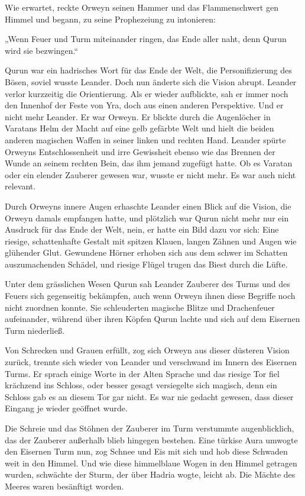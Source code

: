 \documentclass[10pt, a4paper, oneside]{book}
\begin{document}
Wie erwartet, reckte Orweyn seinen Hammer und das Flammenschwert gen Himmel und begann, zu seine Prophezeiung zu intonieren:

„Wenn Feuer und Turm miteinander ringen, das Ende aller naht, denn Qurun wird sie bezwingen.“

Qurun war ein hadrisches Wort für das Ende der Welt, die Personifizierung des Bösen, soviel wusste Leander. Doch nun änderte sich die Vision abrupt. Leander verlor kurzzeitig die Orientierung. Als er wieder aufblickte, sah er immer noch den Innenhof der Feste von Yra, doch aus einen anderen Perspektive. Und er nicht mehr Leander. Er war Orweyn. Er blickte durch die Augenlöcher in Varatans Helm der Macht auf eine gelb gefärbte Welt und hielt die beiden anderen magischen Waffen in seiner linken und rechten Hand. Leander spürte Orweyns Entschlossenheit und irre Gewissheit ebenso wie das Brennen der Wunde an seinem rechten Bein, das ihm jemand zugefügt hatte. Ob es Varatan oder ein elender Zauberer gewesen war, wusste er nicht mehr. Es war auch nicht relevant.

Durch Orweyns innere Augen erhaschte Leander einen Blick auf die Vision, die Orweyn damals empfangen hatte, und plötzlich war Qurun nicht mehr nur ein Ausdruck für das Ende der Welt, nein, er hatte ein Bild dazu vor sich: Eine riesige, schattenhafte Gestalt mit spitzen Klauen, langen Zähnen und Augen wie glühender Glut. Gewundene Hörner erhoben sich aus dem schwer im Schatten auszumachenden Schädel, und riesige Flügel trugen das Biest durch die Lüfte.

Unter dem grässlichen Wesen Qurun sah Leander Zauberer des Turms und des Feuers sich gegenseitig bekämpfen, auch wenn Orweyn ihnen diese Begriffe noch nicht zuordnen konnte. Sie schleuderten magische Blitze und Drachenfeuer aufeinander, während über ihren Köpfen Qurun lachte und sich auf dem Eisernen Turm niederließ.

Von Schrecken und Grauen erfüllt, zog sich Orweyn aus dieser düsteren Vision zurück, trennte sich wieder von Leander und verschwand im Innern des Eisernen Turms. Er sprach einige Worte in der Alten Sprache und das riesige Tor fiel krächzend ins Schloss, oder besser gesagt versiegelte sich magisch, denn ein Schloss gab es an diesem Tor gar nicht. Es war nie gedacht gewesen, dass dieser Eingang je wieder geöffnet wurde.

Die Schreie und das Stöhnen der Zauberer im Turm verstummte augenblicklich, das der Zauberer außerhalb blieb hingegen bestehen. Eine türkise Aura umwogte den Eisernen Turm nun, zog Schnee und Eis mit sich und hob diese Schwaden weit in den Himmel. Und wie diese himmelblaue Wogen in den Himmel getragen wurden, schwächte der Sturm, der über Hadria wogte, leicht ab. Die Mächte des Meeres waren besänftigt worden.
\end{document}
